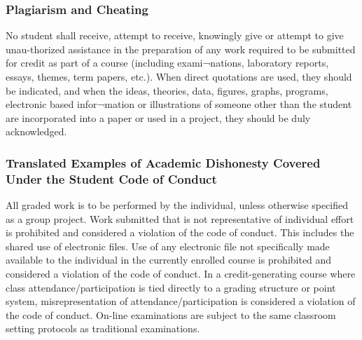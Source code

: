 \documentclass[11pt,]{article}
\begin{document}
\hypertarget{plagiarism-and-cheating}{%
\subsubsection{Plagiarism and Cheating}\label{plagiarism-and-cheating}}

No student shall receive, attempt to receive, knowingly give or attempt to give unau-thorized assistance in
the preparation of any work required to be submitted for credit as part of a course (including exami¬nations,
laboratory reports, essays, themes, term papers, etc.). When direct quotations are used, they should be
indicated, and when the ideas, theories, data, figures, graphs, programs, electronic based infor¬mation or
illustrations of someone other than the student are incorporated into a paper or used in a project, they should
be duly acknowledged.

\hypertarget{translated-examples-of-academic-dishonesty-covered-under-the-student-code-of-conduct}{%
\subsubsection{Translated Examples of Academic Dishonesty Covered Under the Student Code of Conduct}\label{translated-examples-of-academic-dishonesty-covered-under-the-student-code-of-conduct}}

All graded work is to be performed by the individual, unless otherwise specified as a group project. Work
submitted that is not representative of individual effort is prohibited and considered a violation of the code of
conduct. This includes the shared use of electronic files. Use of any electronic file not specifically made
available to the individual in the currently enrolled course is prohibited and considered a violation of the
code of conduct. In a credit-generating course where class attendance/participation is tied directly to a
grading structure or point system, misrepresentation of attendance/participation is considered a
violation of the code of conduct. On-line examinations are subject to the same classroom setting
protocols as traditional examinations.
\end{document}
